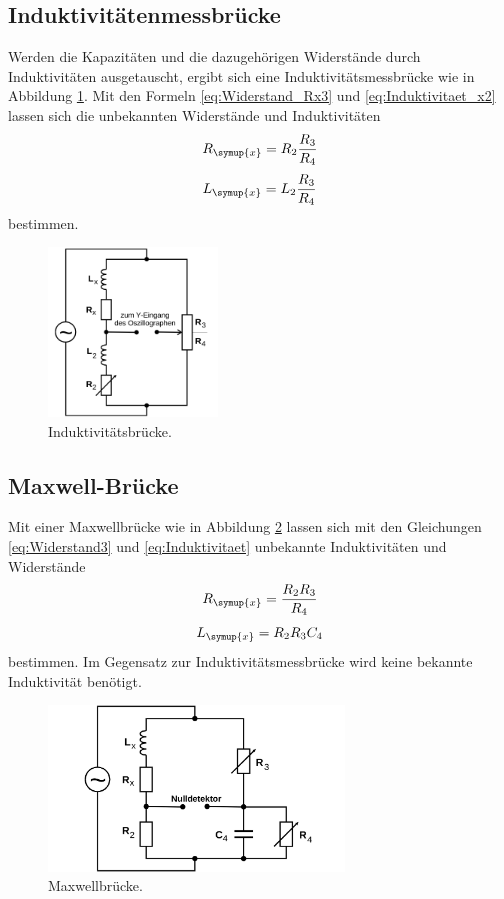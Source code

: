 \subsection{Induktivitätenmessbrücke}
Werden die Kapazitäten und die dazugehörigen Widerstände durch Induktivitäten ausgetauscht,
 ergibt sich eine Induktivitätsmessbrücke wie in Abbildung \ref{fig:indbruecke}.
Mit den Formeln \ref{eq:Widerstand_Rx3} und \ref{eq:Induktivitaet_x2} lassen sich die
unbekannten Widerstände und Induktivitäten
\begin{equation}
R_\symup{x}=R_2\frac{R_3}{R_4}
\label{eq:Widerstand_Rx3}
\end{equation}
\begin{equation}
L_\symup{x}=L_2 \frac{R_3}{R_4}
\label{eq:Induktivitaet_x2}
\end{equation}
bestimmen.
\begin{figure}
  \centering
  \includegraphics[width=0.4\textwidth]{Bilder/Induktivitaetsbruecke.png}
  \caption{Induktivitätsbrücke\cite{sample}.}
  \label{fig:indbruecke}
\end{figure}
\subsection{Maxwell-Brücke}
Mit einer Maxwellbrücke wie in Abbildung \ref{fig:Maxwellb} lassen sich mit
den Gleichungen \eqref{eq:Widerstand3} und \eqref{eq:Induktivitaet} unbekannte
Induktivitäten und Widerstände
\begin{equation}
R_\symup{x}= \frac{R_2 R_3}{R_4}
\label{eq:Widerstand3}
\end{equation}
\begin{equation}
L_\symup{x}=R_2 R_3 C_4
\label{eq:Induktivitaet}
\end{equation}
bestimmen. Im Gegensatz zur Induktivitätsmessbrücke
wird keine bekannte Induktivität benötigt.
\begin{figure}
  \centering
  \includegraphics[width=0.7\textwidth]{Bilder/Maxwellbruecke.png}
  \caption{Maxwellbrücke\cite{sample}.}
  \label{fig:Maxwellb}
\end{figure}
